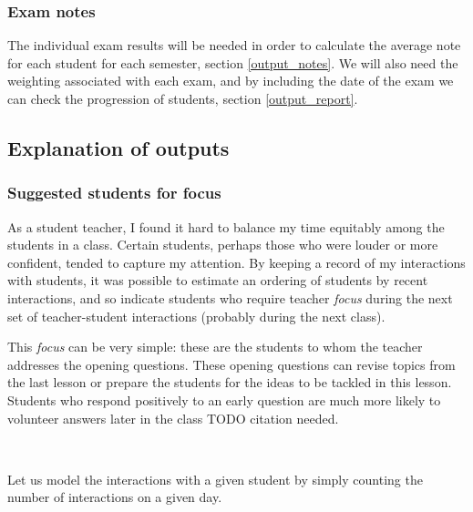 \documentclass[10pt]{article}
\begin{document}
\subsubsection{Exam notes}

The individual exam results will be needed in order to calculate the average note for each student for each semester, section \ref{output_notes}. We will also need the weighting associated with each exam, and by including the date of the exam we can check the progression of students, section \ref{output_report}.




\subsection{Explanation of outputs}

\subsubsection{Suggested students for focus} \label{output_focus}

As a student teacher, I found it hard to balance my time equitably among the students in a class. Certain students, perhaps those who were louder or more confident, tended to capture my attention. By keeping a record of my interactions with students, it was possible to estimate an ordering of students by recent interactions, and so indicate students who require teacher \emph{focus} during the next set of teacher-student interactions (probably during the next class).

This \emph{focus} can be very simple: these are the students to whom the teacher addresses the opening questions. These opening questions can revise topics from the last lesson or prepare the students for the ideas to be tackled in this lesson. Students who respond positively to an early question are much more likely to volunteer answers later in the class TODO citation needed.

\

Let us model the interactions with a given student by simply counting the number of interactions on a given day.
\end{document}
